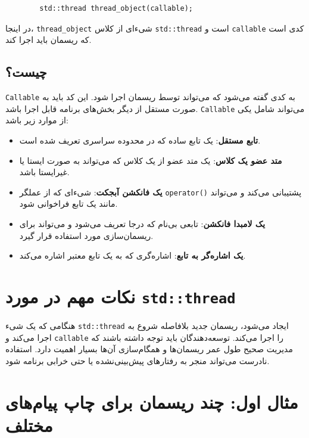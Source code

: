 \documentclass[12pt, a4paper]{report}
\begin{document}
\begin{LTR}
	\begin{lstlisting}
		std::thread thread_object(callable);
	\end{lstlisting}
\end{LTR}

در اینجا، \texttt{thread\_object} شیءای از کلاس \texttt{std::thread} است و \texttt{callable} کدی است که ریسمان باید اجرا کند.

\subsection{ چیست؟}

\texttt{Callable} به کدی گفته می‌شود که می‌تواند توسط ریسمان اجرا شود. این کد باید به صورت مستقل از دیگر بخش‌های برنامه قابل اجرا باشد. \texttt{Callable} می‌تواند شامل یکی از موارد زیر باشد:

\begin{itemize}
	\item \textbf{تابع مستقل}: یک تابع ساده که در محدوده سراسری تعریف شده است.
	\item \textbf{متد عضو یک کلاس}: یک متد عضو از یک کلاس که می‌تواند به صورت ایستا یا غیرایستا باشد.
	\item \textbf{یک فانکشن آبجکت}: شیءای که از عملگر \texttt{operator()} پشتیبانی می‌کند و می‌تواند مانند یک تابع فراخوانی شود.
	\item \textbf{یک لامبدا فانکشن}: تابعی بی‌نام که درجا تعریف می‌شود و می‌تواند برای ریسمان‌سازی مورد استفاده قرار گیرد.
	\item \textbf{یک اشاره‌گر به تابع}: اشاره‌گری که به یک تابع معتبر اشاره می‌کند.
\end{itemize}

\section{نکات مهم در مورد \texttt{std::thread}}

هنگامی که یک شیء \texttt{std::thread} ایجاد می‌شود، ریسمان جدید بلافاصله شروع به اجرا می‌کند و \texttt{callable} را اجرا می‌کند. توسعه‌دهندگان باید توجه داشته باشند که مدیریت صحیح طول عمر ریسمان‌ها و همگام‌سازی آن‌ها بسیار اهمیت دارد. استفاده نادرست می‌تواند منجر به رفتارهای پیش‌بینی‌نشده یا حتی خرابی برنامه شود.

\section*{مثال اول: چند ریسمان برای چاپ پیام‌های مختلف}
\end{document}
